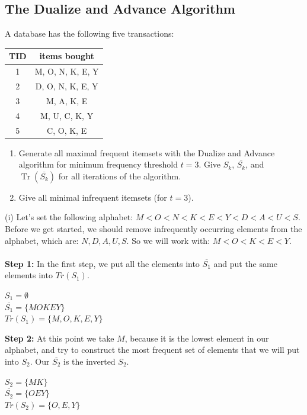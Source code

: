\documentclass{article}
\begin{document}
  \subsection{The Dualize and Advance Algorithm }
  \begin{centerframebox}
    A database has the following five transactions:

    \begin{center}
      \begin{tabular}{|c|c|}
        \hline
        TID & items bought \\ \hline
        1 & M, O, N, K, E, Y \\ \hline
        2 & D, O, N, K, E, Y \\ \hline
        3 & M, A, K, E \\ \hline
        4 & M, U, C, K, Y \\ \hline
        5 & C, O, K, E \\ \hline
      \end{tabular}
    \end{center}

    \begin{enumerate}[label=(\roman*)]
      \item Generate all maximal frequent itemsets with the Dualize and Advance algorithm for minimum frequency threshold $t = 3$.
      Give $S_k$, $\overline{S_k}$, and $\operatorname{Tr}(\overline{S_k})$ for all iterations of the algorithm.
      \item Give all minimal infrequent itemsets (for $t = 3$).
    \end{enumerate}
  \end{centerframebox}

  (i) Let's set the following alphabet: $M < O < N < K < E < Y < D < A < U < S$.
  Before we get started, we should remove infrequently occurring elements from the alphabet, which are: $N, D, A, U, S$. So we will work with: $M < O < K < E < Y$. \\
  \\
  \textbf{Step 1:}
  In the first step, we put all the elements into $\overline{S_1}$ and put the same elements into $Tr(S_1)$.
  \begin{center}
    $S_1 = \emptyset$ \\
    $\overline{S_1} = \{MOKEY\}$ \\
    $Tr(S_1) = \{M,O,K,E,Y\}$
  \end{center}

  \textbf{Step 2:}
  At this point we take $M$, because it is the lowest element in our alphabet, and try to construct the most frequent set of elements that we will put into $S_2$. Our $\overline{S_2}$ is the inverted $S_2$.
  \begin{center}
    $S_2 = \{MK\}$ \\
    $\overline{S_2} = \{OEY\}$ \\
    $Tr(S_2) = \{O,E,Y\}$
  \end{center}
\end{document}

